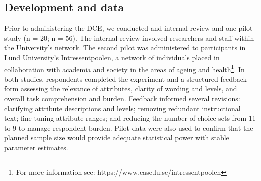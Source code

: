 \documentclass[3p,11pt ]{elsarticle}
\begin{document}
%
%
%


%
%
%
%
%





\subsection{Development and data}

Prior to administering the DCE, we conducted and internal review and one pilot study (n = 20; n = 56).
The internal review involved researchers and staff within the University’s network.
The second pilot was administered to participants in Lund University’s Intressentpoolen,
a network of individuals placed in collaboration with academia and society in the areas of ageing and health\footnote{ For more information see: https://www.case.lu.se/intressentpoolen}.
In both studies, respondents completed the experiment and a structured feedback form assessing the relevance of attributes, clarity of wording and levels, and overall task comprehension and burden.
Feedback informed several revisions: clarifying attribute descriptions and levels; removing redundant instructional text; fine-tuning attribute ranges; and reducing the number of choice sets from 11 to 9 to manage respondent burden. Pilot data were also used to confirm that the planned sample size would provide adequate statistical power with stable parameter estimates.
\end{document}
